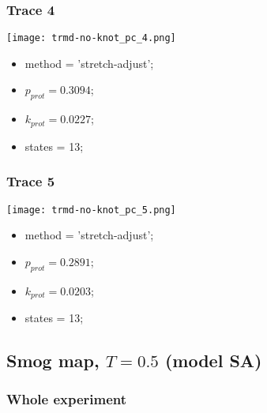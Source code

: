 \begin{minipage}[c]{0.45\textwidth}
\begin{minipage}[c]{0.45\textwidth}
\subsubsection{Trace 4}
\begin{minipage}[c]{0.7\textwidth}
    \texttt{[image: trmd-no-knot\_pc\_4.png]}
\end{minipage}
\hfill
\begin{minipage}[c]{0.45\textwidth}
    \begin{itemize}
        \item method = 'stretch-adjust';
        \item $p_{prot}=0.3094$;
        \item $k_{prot}=0.0227$;
        \item states = 13;
    \end{itemize}
\end{minipage}

\subsubsection{Trace 5}
\begin{minipage}[c]{0.7\textwidth}
    \texttt{[image: trmd-no-knot\_pc\_5.png]}
\end{minipage}
\hfill
\begin{minipage}[c]{0.45\textwidth}
    \begin{itemize}
        \item method = 'stretch-adjust';
        \item $p_{prot}=0.2891$;
        \item $k_{prot}=0.0203$;
        \item states = 13;
    \end{itemize}
\end{minipage}

\subsection{Smog map, $T=0.5$ (model SA)}
\subsubsection{Whole experiment}


\end{minipage}
\end{minipage}
